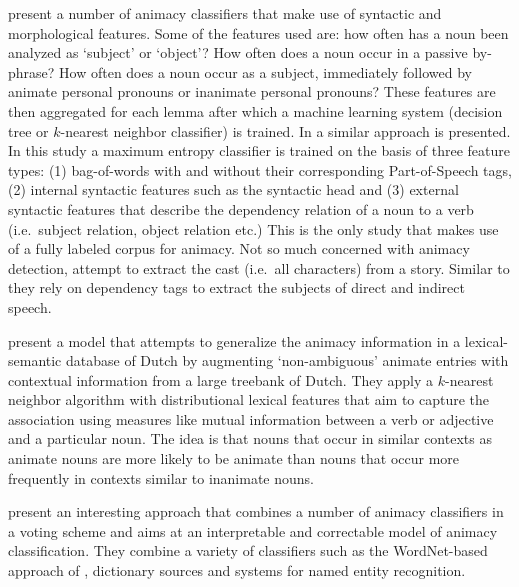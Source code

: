 \documentclass[a4paper,UKenglish]{oasics}
\begin{document}
\cite{ovrelid:04,ovrelid:05,ovrelid:06,ovrelid:08,ovrelid:09} present
a number of animacy classifiers that make use of syntactic and
morphological features. Some of the features used are: how often has a
noun been analyzed as `subject' or `object'? How often does a noun
occur in a passive by-phrase? How often does a noun occur as a
subject, immediately followed by animate personal pronouns or
inanimate personal pronouns?  These features are then aggregated for
each lemma after which a machine learning system (decision tree or
$k$-nearest neighbor classifier) is trained. In \cite{bowman:12} a
similar approach is presented. In this study a maximum entropy
classifier is trained on the basis of three feature types: (1)
bag-of-words with and without their corresponding Part-of-Speech tags,
(2) internal syntactic features such as the syntactic head and (3)
external syntactic features that describe the dependency relation of a
noun to a verb (i.e.\ subject relation, object relation etc.)  This is
the only study that makes use of a fully labeled corpus for animacy.
Not so much concerned with animacy detection, \cite{karsdorp:12}
attempt to extract the cast (i.e.\ all characters) from a
story. Similar to \cite{bowman:12} they rely on dependency tags to
extract the subjects of direct and indirect speech.

\cite{bloem:13} present a model that attempts to generalize the
animacy information in a lexical-semantic database of Dutch by
augmenting `non-ambiguous' animate entries with contextual information
from a large treebank of Dutch. They apply a $k$-nearest neighbor
algorithm with distributional lexical features that aim to capture the
association using measures like mutual information between a verb or
adjective and a particular noun. The idea is that nouns that occur in
similar contexts as animate nouns are more likely to be animate than
nouns that occur more frequently in contexts similar to inanimate nouns.

\cite{moore:13} present an interesting approach that combines a number
of animacy classifiers in a voting scheme and aims at an interpretable
and correctable model of animacy classification. They combine a
variety of classifiers such as the WordNet-based approach of
\cite{evans:00}, dictionary sources and systems for named entity
recognition.
\end{document}
